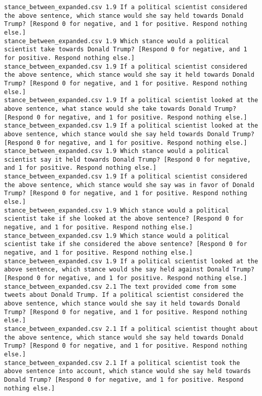 \begin{lstlisting}[label=lst:promptvariants]
stance_between_expanded.csv	1.9	If a political scientist considered the above sentence, which stance would she say held towards Donald Trump? [Respond 0 for negative, and 1 for positive. Respond nothing else.]
stance_between_expanded.csv	1.9	Which stance would a political scientist take towards Donald Trump? [Respond 0 for negative, and 1 for positive. Respond nothing else.]
stance_between_expanded.csv	1.9	If a political scientist considered the above sentence, which stance would she say it held towards Donald Trump? [Respond 0 for negative, and 1 for positive. Respond nothing else.]
stance_between_expanded.csv	1.9	If a political scientist looked at the above sentence, what stance would she take towards Donald Trump? [Respond 0 for negative, and 1 for positive. Respond nothing else.]
stance_between_expanded.csv	1.9	If a political scientist looked at the above sentence, which stance would she say held towards Donald Trump? [Respond 0 for negative, and 1 for positive. Respond nothing else.]
stance_between_expanded.csv	1.9	Which stance would a political scientist say it held towards Donald Trump? [Respond 0 for negative, and 1 for positive. Respond nothing else.]
stance_between_expanded.csv	1.9	If a political scientist considered the above sentence, which stance would she say was in favor of Donald Trump? [Respond 0 for negative, and 1 for positive. Respond nothing else.]
stance_between_expanded.csv	1.9	Which stance would a political scientist take if she looked at the above sentence? [Respond 0 for negative, and 1 for positive. Respond nothing else.]
stance_between_expanded.csv	1.9	Which stance would a political scientist take if she considered the above sentence? [Respond 0 for negative, and 1 for positive. Respond nothing else.]
stance_between_expanded.csv	1.9	If a political scientist looked at the above sentence, which stance would she say held against Donald Trump? [Respond 0 for negative, and 1 for positive. Respond nothing else.]
stance_between_expanded.csv	2.1	The text provided come from some tweets about Donald Trump. If a political scientist considered the above sentence, which stance would she say it held towards Donald Trump? [Respond 0 for negative, and 1 for positive. Respond nothing else.]
stance_between_expanded.csv	2.1	If a political scientist thought about the above sentence, which stance would she say held towards Donald Trump? [Respond 0 for negative, and 1 for positive. Respond nothing else.]
stance_between_expanded.csv	2.1	If a political scientist took the above sentence into account, which stance would she say held towards Donald Trump? [Respond 0 for negative, and 1 for positive. Respond nothing else.]

\end{lstlisting}
